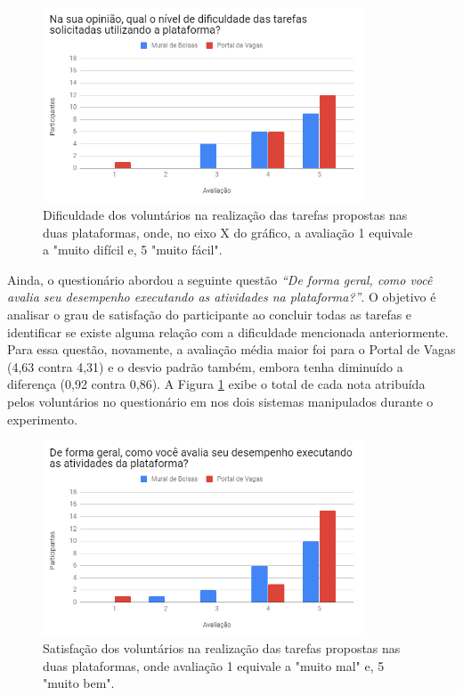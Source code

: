 \begin{figure}[ht]
    \caption{Dificuldade dos voluntários na realização das tarefas propostas nas duas plataformas, onde, no eixo X do gráfico, a avaliação 1 equivale a "muito difícil e, 5 "muito fácil".}
       	\begin{center}
            \includegraphics[width=0.85\textwidth]{figuras/avaliacao/ab-dificuldade.png}
        \end{center}
    \label{avalGrafABDesemp}
\end{figure} 

Ainda, o questionário abordou a seguinte questão \textit{“De forma geral, como você avalia seu desempenho executando as atividades na plataforma?”}. O objetivo é analisar o grau de satisfação do participante ao concluir todas as tarefas e identificar se existe alguma relação com a dificuldade mencionada anteriormente. Para essa questão, novamente, a avaliação média maior foi para o Portal de Vagas (4,63 contra 4,31) e o desvio padrão também, embora tenha diminuído a diferença (0,92 contra 0,86). A Figura \ref{avalGrafABDesemp} exibe o total de cada nota atribuída pelos voluntários no questionário em nos dois sistemas manipulados durante o experimento.

\begin{figure}[H]
    \caption{Satisfação dos voluntários na realização das tarefas propostas nas duas plataformas, onde avaliação 1 equivale a "muito mal" e, 5 "muito bem".}
       	\begin{center}
            \includegraphics[width=0.85\textwidth]{figuras/avaliacao/ab-desempenho.png}
        \end{center}
    \label{avalGrafABSatisfacao}
\end{figure} 

